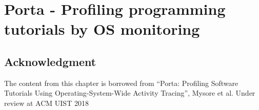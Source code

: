 \chapter{Porta - Profiling programming tutorials by OS monitoring}






\section{Acknowledgment}
The content from this chapter is borrowed from ``Porta: Profiling Software Tutorials Using Operating-System-Wide Activity Tracing'', Mysore et al. Under review at ACM UIST 2018
